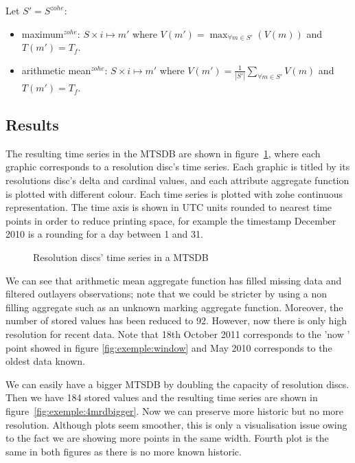 Let $S'=S^{zohe}$:
\begin{itemize}
\item maximum$^{zohe}$: $S \times i \mapsto m'$ where $V(m') =
  \max_{\forall m \in S'}(V(m))$ and $T(m')=T_f$.
\item arithmetic mean$^{zohe}$: $S \times i \mapsto m'$ where $V(m')
  = \frac{1}{|S'|} \sum\limits_{\forall m\in S'} V(m)$ and
  $T(m')=T_f$. 
\end{itemize}







\subsection{Results}

The resulting time series in the MTSDB are shown in
figure~\ref{fig:exemple:4mrd}, where each graphic corresponds to a
resolution disc's time series. Each graphic is titled by its
resolutions disc's delta and cardinal values, and each attribute
aggregate function is plotted with different colour.  Each time series
is plotted with zohe continuous representation. The time axis is shown
in UTC units rounded to nearest time points in order to reduce
printing space, for example the timestamp December 2010 is a rounding
for a day between 1 and 31.


\begin{figure}[tp]
  \centering
  
  \caption{Resolution discs' time series in a MTSDB}
  \label{fig:exemple:4mrd}
\end{figure}


We can see that arithmetic mean aggregate function has filled
missing data and filtered outlayers observations; note that we could
be stricter by using a non filling aggregate such as an unknown marking
aggregate function. Moreover, the number of stored values has been
reduced to 92. However, now there is only high resolution for recent
data. Note that 18th October 2011 corresponds to the 'now ' point
showed in figure \ref{fig:exemple:window} and May 2010 corresponds to
the oldest data known.


We  can  easily  have a  bigger  MTSDB  by  doubling the  capacity  of
resolution discs.  Then we  have 184 stored  values and  the resulting
time series are  shown in figure~\ref{fig:exemple:4mrdbigger}.  Now we
can preserve more historic but no more resolution. Although plots seem
smoother, this is only a visualisation  issue owing to the fact we are
showing more points in the same width. Fourth plot is the same in both
figures as there is no more known historic.

